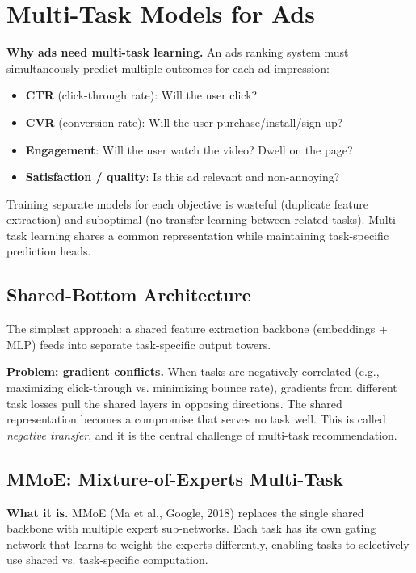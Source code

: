 \section{Multi-Task Models for Ads}
\label{sr:sec:multitask_ads}

\textbf{Why ads need multi-task learning.} An ads ranking system must simultaneously predict multiple outcomes for each ad impression:
\begin{itemize}
    \item \textbf{CTR} (click-through rate): Will the user click?
    \item \textbf{CVR} (conversion rate): Will the user purchase/install/sign up?
    \item \textbf{Engagement}: Will the user watch the video? Dwell on the page?
    \item \textbf{Satisfaction / quality}: Is this ad relevant and non-annoying?
\end{itemize}

Training separate models for each objective is wasteful (duplicate feature extraction) and suboptimal (no transfer learning between related tasks). Multi-task learning shares a common representation while maintaining task-specific prediction heads.

\subsection{Shared-Bottom Architecture}

The simplest approach: a shared feature extraction backbone (embeddings + MLP) feeds into separate task-specific output towers.

\textbf{Problem: gradient conflicts.} When tasks are negatively correlated (e.g., maximizing click-through vs. minimizing bounce rate), gradients from different task losses pull the shared layers in opposing directions. The shared representation becomes a compromise that serves no task well. This is called \textit{negative transfer}, and it is the central challenge of multi-task recommendation.

\subsection{MMoE: Mixture-of-Experts Multi-Task}

\textbf{What it is.} MMoE (Ma et al., Google, 2018) replaces the single shared backbone with multiple expert sub-networks. Each task has its own gating network that learns to weight the experts differently, enabling tasks to selectively use shared vs. task-specific computation.

